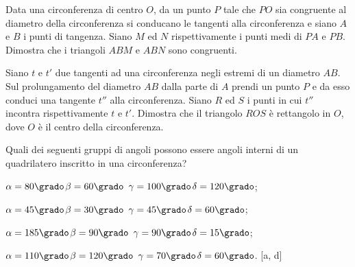 \begin{multicols}{2}
\begin{esercizio}
\label{ese:5.39}
Data una circonferenza di centro $O$, da un punto $P$ tale che $PO$ 
sia congruente al diametro della circonferenza si conducano le 
tangenti alla circonferenza e siano $A$ e $B$ i punti di tangenza. 
Siano $M$ ed $N$ rispettivamente i punti medi di $PA$ e $PB$. 
Dimostra che i triangoli $ABM$ e $ABN$ sono congruenti.
\end{esercizio}

\begin{esercizio}
\label{ese:5.40}
Siano $t$ e $t'$ due tangenti ad una circonferenza negli estremi di 
un diametro $AB$. Sul prolungamento del diametro $AB$ dalla parte di 
$A$ prendi un punto $P$ e da esso conduci una tangente $t''$ alla 
circonferenza. Siano $R$ ed $S$ i punti in cui $t''$ incontra 
rispettivamente $t$ e $t'$.  Dimostra che il triangolo $ROS$ è 
rettangolo in $O$, dove $O$ è il centro della circonferenza.
\end{esercizio}

\end{multicols}



\begin{esercizio}
\label{ese:5.41}
Quali dei seguenti gruppi di angoli possono essere angoli interni di 
un quadrilatero inscritto in una circonferenza?
\begin{enumeratea}
\item $\alpha=80\grado$\quad$\beta=60\grado$\quad 
$\gamma=100\grado$\quad $\delta=120\grado$;
\item $\alpha=45\grado$\quad $\beta=30\grado$\quad 
$\gamma=45\grado$\quad $\delta=60\grado$;
\item $\alpha=185\grado$\quad $\beta=90\grado$\quad 
$\gamma=90\grado$\quad $\delta=15\grado$;
\item $\alpha=110\grado$\quad $\beta=120\grado$\quad 
$\gamma=70\grado$\quad $\delta=60\grado$.
\hfill [a, d]
\end{enumeratea}
\end{esercizio}

